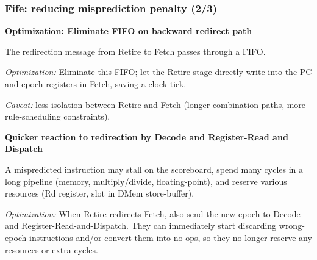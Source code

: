 \begin{frame}[fragile]
\frametitle{Fife: reducing misprediction penalty (2/3)}

\footnotesize

\hdivider

{\bf Optimization: Eliminate FIFO on backward redirect path}

\vx

The redirection message from Retire to Fetch passes through a FIFO.

\vxx

\emph{Optimization:} Eliminate this FIFO; let the Retire stage
directly write into the PC and epoch registers in Fetch, saving a
clock tick.

\vx

{\emph{Caveat:}} less isolation between Retire and Fetch (longer
combination paths, more rule-scheduling constraints).

\PAUSE{\vxxxx}

\hdivider

{\bf Quicker reaction to redirection by Decode and Register-Read and Dispatch}

\vx

A mispredicted instruction may stall on the scoreboard, spend many
cycles in a long pipeline (memory, multiply/divide, floating-point),
and reserve various resources (Rd register, slot in DMem
store-buffer).

\vxx

{\emph{Optimization:}} When Retire redirects Fetch, also send the new
epoch to Decode and Register-Read-and-Dispatch.  They can immediately
start discarding wrong-epoch instructions and/or convert them into
no-ops, so they no longer reserve any resources or extra cycles.

\end{frame}


